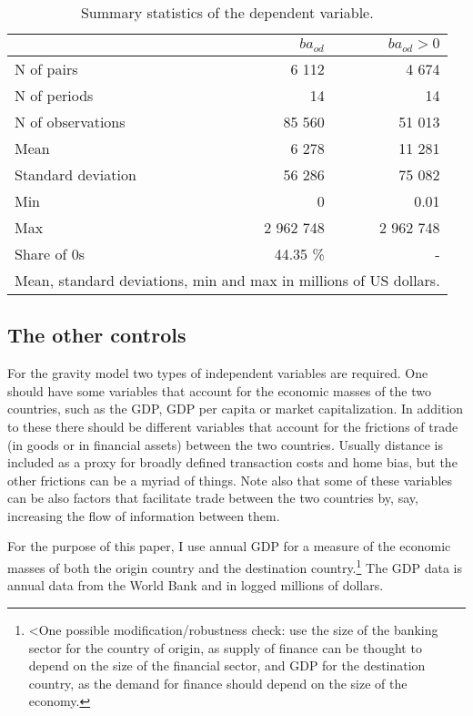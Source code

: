 \documentclass[12pt,a4paper]{article}
\begin{document}
\begin{table}
\centering
\begin{tabular}{l|r r }
\hline
 & $ba_{od}$ & $ba_{od} > 0$  \\ 
\hline
N of pairs & 6 112 & 4 674  \\
N of periods & 14 & 14  \\
N of observations & 85 560 & 51 013 \\
\hline
Mean & 6 278 & 11 281  \\
Standard deviation & 56 286 & 75 082 \\
Min & 0 & 0.01 \\
Max & 2 962 748 & 2 962 748 \\
\hline
Share of 0s & 44.35 \% & - \\
\hline 
\multicolumn{3}{l}{\footnotesize Mean, standard deviations, min and max in millions of US dollars.}
\end{tabular}
\caption{Summary statistics of the dependent variable.}
\label{tab:ba_od}
\end{table}


\subsection{The other controls}

For the gravity model two types of independent variables are required. One should have some variables that account for the economic masses of the two countries, such as the GDP, GDP per capita or market capitalization. In addition to these there should be different variables that account for the frictions of trade (in goods or in financial assets) between the two countries. Usually distance is included as a proxy for broadly defined transaction costs and home bias, but the other frictions can be a myriad of things. Note also that some of these variables can be also factors that facilitate trade between the two countries by, say, increasing the flow of information between them. 

For the purpose of this paper, I use annual GDP for a measure of the economic masses of both the origin country and the destination country.\footnote{<One possible modification/robustness check: use the size of the banking sector for the country of origin, as supply of finance can be thought to depend on the size of the financial sector, and GDP for the destination country, as the demand for finance should depend on the size of the economy.} The GDP data is annual data from the World Bank and in logged millions of dollars. 
\end{document}
